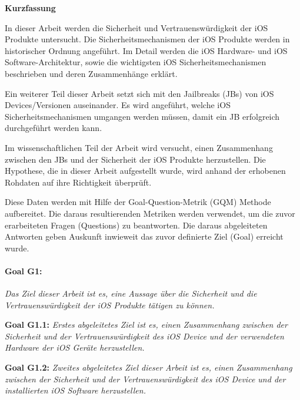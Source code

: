 %
%
% 
% 
% 



\cleardoublepage

\begin{center}
{\Large\bfseries Kurzfassung}
\end{center}
In dieser Arbeit werden die Sicherheit und Vertrauenswürdigkeit der iOS Produkte untersucht. Die Sicherheitsmechanismen der iOS Produkte werden in historischer Ordnung angeführt. Im Detail werden die iOS Hardware- und iOS Software-Architektur, sowie die wichtigsten iOS Sicherheitsmechanismen beschrieben und deren Zusammenhänge erklärt. \par 
Ein weiterer Teil dieser Arbeit setzt sich mit den Jailbreaks (JBs) von iOS Devices/Versionen auseinander. Es wird angeführt, welche iOS Sicherheitsmechanismen umgangen werden müssen, damit ein JB erfolgreich durchgeführt werden kann. \par 
Im wissenschaftlichen Teil der Arbeit wird versucht, einen Zusammenhang zwischen den JBs und der Sicherheit der iOS Produkte herzustellen. Die Hypothese, die in dieser Arbeit aufgestellt wurde, wird anhand der erhobenen Rohdaten auf ihre Richtigkeit überprüft. \par
Diese Daten werden mit Hilfe der Goal-Question-Metrik (GQM) Methode aufbereitet. Die daraus resultierenden Metriken werden verwendet, um die zuvor erarbeiteten Fragen (Questions) zu beantworten. Die daraus abgeleiteten Antworten geben Auskunft inwieweit das zuvor definierte Ziel (Goal) erreicht wurde.\par 

\paragraph{Goal G1:}\textit{\glqq Das Ziel dieser Arbeit ist es, eine Aussage über die Sicherheit und die Vertrauenswürdigkeit der iOS Produkte tätigen zu können.\grqq{}} \par
\textbf{Goal G1.1:} \textit{\glqq Erstes abgeleitetes Ziel ist es, einen Zusammenhang zwischen der Sicherheit und der Vertrauenswürdigkeit des iOS Device und der verwendeten Hardware der iOS Geräte herzustellen.\grqq{}} \par 
\textbf{Goal G1.2:} \textit{\glqq Zweites abgeleitetes Ziel dieser Arbeit ist es, einen Zusammenhang zwischen der Sicherheit und der Vertrauenswürdigkeit des iOS Device und der installierten iOS Software herzustellen.\grqq{}}

